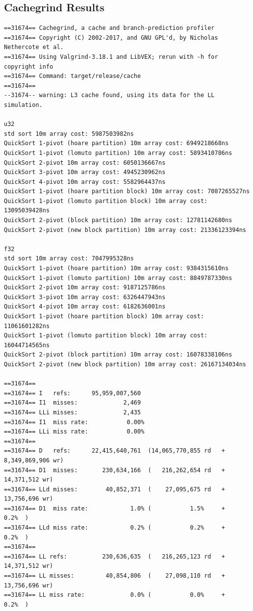 \documentclass[a4paper,oneside,12pt]{book}
\begin{document}
\subsection{Cachegrind Results}
\hypertarget{cachegrindresult}{}
\small
\begin{verbatim}
==31674== Cachegrind, a cache and branch-prediction profiler
==31674== Copyright (C) 2002-2017, and GNU GPL'd, by Nicholas Nethercote et al.
==31674== Using Valgrind-3.18.1 and LibVEX; rerun with -h for copyright info
==31674== Command: target/release/cache
==31674== 
--31674-- warning: L3 cache found, using its data for the LL simulation.

u32
std sort 10m array cost: 5987503982ns
QuickSort 1-pivot (hoare partition) 10m array cost: 6949218668ns
QuickSort 1-pivot (lomuto partition) 10m array cost: 5893410786ns
QuickSort 2-pivot 10m array cost: 6050136667ns
QuickSort 3-pivot 10m array cost: 4945230962ns
QuickSort 4-pivot 10m array cost: 5582964437ns
QuickSort 1-pivot (hoare partition block) 10m array cost: 7087265527ns
QuickSort 1-pivot (lomuto partition block) 10m array cost: 13095039428ns
QuickSort 2-pivot (block partition) 10m array cost: 12781142680ns
QuickSort 2-pivot (new block partition) 10m array cost: 21336123394ns

f32
std sort 10m array cost: 7047995328ns
QuickSort 1-pivot (hoare partition) 10m array cost: 9384315610ns
QuickSort 1-pivot (lomuto partition) 10m array cost: 8849787330ns
QuickSort 2-pivot 10m array cost: 9187125786ns
QuickSort 3-pivot 10m array cost: 6326447943ns
QuickSort 4-pivot 10m array cost: 6182636001ns
QuickSort 1-pivot (hoare partition block) 10m array cost: 11061601282ns
QuickSort 1-pivot (lomuto partition block) 10m array cost: 16044714565ns
QuickSort 2-pivot (block partition) 10m array cost: 16078338106ns
QuickSort 2-pivot (new block partition) 10m array cost: 26167134034ns

==31674== 
==31674== I   refs:      95,959,007,560
==31674== I1  misses:             2,469
==31674== LLi misses:             2,435
==31674== I1  miss rate:           0.00%
==31674== LLi miss rate:           0.00%
==31674== 
==31674== D   refs:      22,415,640,761  (14,065,770,855 rd   + 8,349,869,906 wr)
==31674== D1  misses:       230,634,166  (   216,262,654 rd   +    14,371,512 wr)
==31674== LLd misses:        40,852,371  (    27,095,675 rd   +    13,756,696 wr)
==31674== D1  miss rate:            1.0% (           1.5%     +           0.2%  )
==31674== LLd miss rate:            0.2% (           0.2%     +           0.2%  )
==31674== 
==31674== LL refs:          230,636,635  (   216,265,123 rd   +    14,371,512 wr)
==31674== LL misses:         40,854,806  (    27,098,110 rd   +    13,756,696 wr)
==31674== LL miss rate:             0.0% (           0.0%     +           0.2%  )


\end{verbatim}
\end{document}
